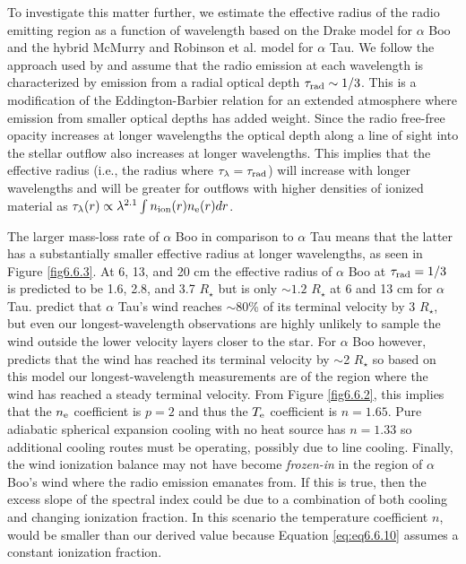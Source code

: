 To investigate this matter further,  we estimate the effective radius of the radio emitting region as a function of wavelength based on the Drake model for $\alpha$ Boo and the hybrid McMurry and Robinson et al. model for $\alpha$ Tau. We follow the approach used by \cite{cassinelli_1977} and assume that the radio emission at each wavelength is characterized by emission from a radial optical depth $\tau _{\rm{rad}}\sim 1/3$. This is a modification of the Eddington-Barbier relation for an extended atmosphere where emission from smaller optical depths has added weight. Since the radio free-free opacity increases at longer wavelengths the optical depth along a line of sight into the stellar outflow also increases at longer wavelengths. This implies that the effective radius (i.e., the radius where $\tau _{\lambda} = \tau _{\rm{rad}}$) will increase with longer wavelengths and will be greater for outflows with higher densities of ionized material as $\tau _{\lambda}(r) \propto \lambda ^{2.1} \int n_{\rm{ion}}(r)n_{\rm{e}}(r) dr$. 

The larger mass-loss rate of $\alpha$ Boo in comparison to $\alpha$ Tau means that the latter has a substantially smaller effective radius at longer wavelengths, as seen in Figure \ref{fig6.6.3}. At 6, 13, and 20 cm the effective radius of $\alpha$ Boo at $\tau _{\rm{rad}}=1/3$ is predicted to be 1.6, 2.8, and 3.7 $R_{\star}$ but is only $\sim 1.2$ $R_{\star}$ at 6 and 13 cm for $\alpha$ Tau. \cite{robinson_1998} predict that $\alpha$ Tau's wind reaches $\sim$80\% of its terminal velocity by 3 $R_{\star}$, but even our longest-wavelength observations are highly unlikely to sample the wind outside the lower velocity layers closer to the star. For $\alpha$ Boo however, \cite{drake_1985} predicts that the wind has reached its terminal velocity by $\sim$2 $R_{\star}$ so based on this model our longest-wavelength measurements are of the region where the wind has reached a steady terminal velocity. From Figure \ref{fig6.6.2}, this implies that the $n_{\rm{e}}$ coefficient is $p=2$ and thus the $T_{\rm{e}}$ coefficient is $n=1.65$. Pure adiabatic spherical expansion cooling with no heat source has $n=1.33$ so additional cooling routes must be operating, possibly due to line cooling. Finally, the wind ionization balance may not have become \textit{frozen-in} in the region of $\alpha$ Boo's wind where the radio emission emanates from. If this is true, then the excess slope of the spectral index could be due to a combination of both cooling and changing ionization fraction. In this scenario the temperature coefficient $n$, would be smaller than our derived value because Equation \ref{eq:eq6.6.10} assumes a constant ionization fraction.

